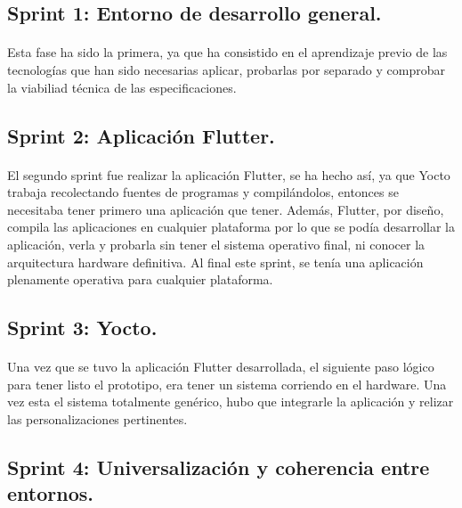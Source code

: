 \subsection{Sprint 1: Entorno de desarrollo general.}

\paragraph{}Esta fase ha sido la primera, ya que ha consistido en el aprendizaje previo
de las tecnologías que han sido necesarias aplicar, probarlas por separado y comprobar
la viabiliad técnica de las especificaciones.

\subsection{Sprint 2: Aplicación Flutter.}

\paragraph{}El segundo sprint fue realizar la aplicación Flutter, se ha hecho así, ya
que Yocto trabaja recolectando fuentes de programas y compilándolos, entonces se
necesitaba tener primero una aplicación que tener. Además, Flutter, por
diseño, compila las aplicaciones en cualquier plataforma por lo que se podía desarrollar
la aplicación, verla y probarla sin tener el sistema operativo final, ni conocer la
arquitectura hardware definitiva. Al final este sprint, se tenía una aplicación plenamente
operativa para cualquier plataforma.

\subsection{Sprint 3: Yocto.}

\paragraph{}Una vez que se tuvo la aplicación Flutter desarrollada, el siguiente paso
lógico para tener listo el prototipo, era tener un sistema corriendo en el hardware.
Una vez esta el sistema totalmente genérico, hubo que integrarle la aplicación y relizar
las personalizaciones pertinentes.

\subsection{Sprint 4: Universalización y coherencia entre entornos.}


